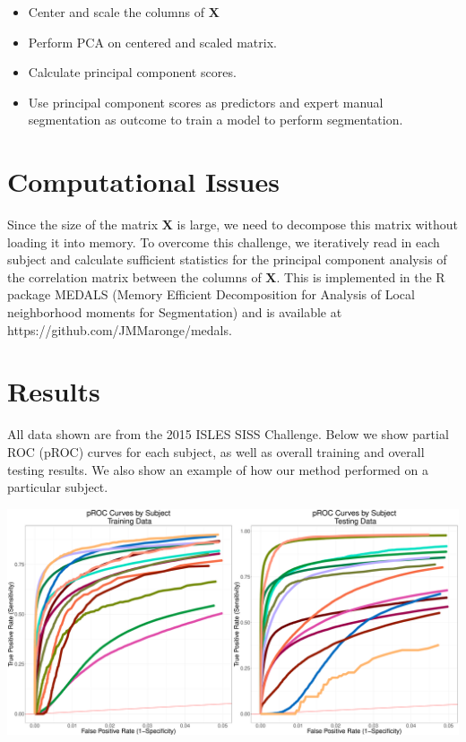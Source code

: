 \documentclass[a0,landscape]{a0poster}
\begin{document}
\begin{multicols}{3}
\begin{itemize}
\item  Center and scale the columns of $\mathbf{X}$
\item Perform PCA on centered and scaled matrix.
\item Calculate principal component scores. 
\item Use principal component scores as predictors and expert manual segmentation as outcome to train a model to perform segmentation.
\end{itemize}
\large{\section*{\color{uwred}Computational Issues}}
\noindent Since the size of the matrix $\mathbf{X}$ is large, we need to decompose this matrix without loading it into memory. To overcome this challenge, we iteratively read in each subject and calculate sufficient statistics for the principal component analysis of the correlation matrix between the columns of $\mathbf{X}$. This is implemented in the R package MEDALS (Memory Efficient Decomposition for Analysis of Local neighborhood moments for Segmentation) and is available at https://github.com/JMMaronge/medals.
\vspace{.5cm}

\large{\section*{\color{uwred}Results}}
\noindent All data shown are from the 2015 ISLES SISS Challenge. Below we show partial ROC (pROC) curves for each subject, as well as overall training and overall testing results. We also show an example of how our method performed on a particular subject.

\begin{center}\vspace{.5cm}
\includegraphics[width=1\linewidth]{procbysubject.pdf}
\end{center}\vspace{.5cm}


\end{multicols}
\end{document}
